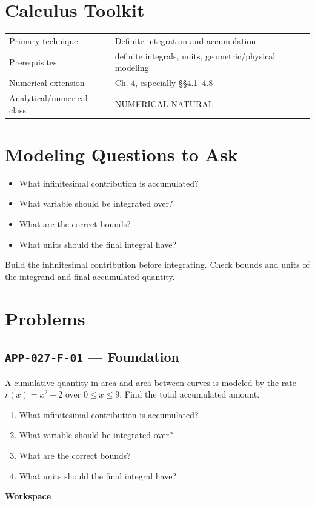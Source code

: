 \documentclass[11pt]{book}
\newcommand{\pid}[1]{\texttt{#1}}
\newcommand{\workspace}{\par\vspace{0.7in}\hrulefill\par\vspace{0.55in}\hrulefill\par}
\begin{document}
\section*{Calculus Toolkit}
\begin{tabularx}{\textwidth}{@{}lX@{}}\toprule
Primary technique & Definite integration and accumulation \\
Prerequisites & definite integrals, units, geometric/physical modeling \\
Numerical extension & Ch. 4, especially §§4.1–4.8 \\
Analytical/numerical class & NUMERICAL-NATURAL \\
\bottomrule\end{tabularx}
\section*{Modeling Questions to Ask}\begin{itemize}
\item What infinitesimal contribution is accumulated?
\item What variable should be integrated over?
\item What are the correct bounds?
\item What units should the final integral have?
\end{itemize}
\begin{errorbox}Build the infinitesimal contribution before integrating. Check bounds and units of the integrand and final accumulated quantity.\end{errorbox}
\section*{Problems}
\subsection*{\pid{APP-027-F-01} — Foundation}
\begin{problembox}
A cumulative quantity in area and area between curves is modeled by the rate $r(x)=x^2+2$ over $0\le x\le 9$. Find the total accumulated amount.
\end{problembox}
\begin{promptbox}\begin{enumerate}
\item What infinitesimal contribution is accumulated?
\item What variable should be integrated over?
\item What are the correct bounds?
\item What units should the final integral have?
\end{enumerate}\end{promptbox}
\textbf{Workspace}\workspace
{}
\end{document}
